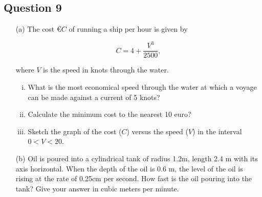 \documentclass[12pt]{article}
\begin{document}
\subsection*{Question 9}

\begin{itemize}

\item[(a)] The cost \euro $C$ of running a ship per hour is given by

$$ C = 4 + \frac{ V^3}{2500},$$

where $V$ is the speed in knots through the water.
\begin{enumerate}[(i)]
	\item What is the most economical speed through the water at which a voyage can be made against a current of 5 knots?
	\item Calculate the minimum cost to the nearest 10 euro?
	\item Sketch the graph of the cost ($C$) versus the speed ($V$) in the interval $0 < V < 20$.
\end{enumerate}
\item[(b)]
Oil is poured into a cylindrical tank of radius 1.2m, length 2.4 m with its axis horizontal.
When the depth of the oil is 0.6 m, the level of the oil is rising at the rate of 0.25cm per second.
How fast is the oil pouring into the tank? Give your answer in cubic meters per minute.


\end{itemize}
\end{document}
